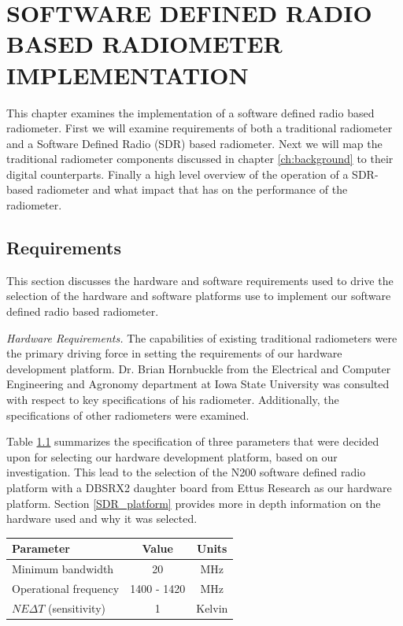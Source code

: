 \chapter{SOFTWARE DEFINED RADIO BASED RADIOMETER IMPLEMENTATION}\label{ch:implementation}

This chapter examines the implementation of a software defined radio based radiometer.  First we will examine requirements of both a traditional radiometer and a Software Defined Radio (SDR) based radiometer.  Next we will map the traditional radiometer components discussed in chapter \ref{ch:background} to their digital counterparts.  Finally a high level overview of the operation of a SDR-based radiometer and what impact that has on the performance of the radiometer.

\section{Requirements}\label{requirements}

This section discusses the hardware and software requirements used to drive the selection of the hardware and software platforms use to implement our software defined radio based radiometer.  

\emph{Hardware Requirements.}  The capabilities of existing traditional radiometers were the primary driving force in setting the requirements of our hardware development platform.  Dr. Brian Hornbuckle from the Electrical and Computer Engineering and Agronomy department at Iowa State University was consulted with respect to key specifications of his radiometer.  Additionally, the specifications of other radiometers were examined. 

Table \ref{rad_performance} summarizes the specification of three parameters that were decided upon for selecting our hardware development platform, based on our investigation.  This lead to the selection of the N200 software defined radio platform with a DBSRX2 daughter board from Ettus Research as our hardware platform.  Section \ref{SDR_platform} provides more in depth information on the hardware used and why it was selected.

\begin{table}[h!tb] \centering
{}
\label{rad_performance}
\begin{tabular}{lcc} \hline
\textbf{Parameter} & \textbf{Value} & \textbf{Units} \\ \hline
Minimum bandwidth & 20 & MHz \\
Operational frequency & 1400 - 1420 & MHz \\
$NE\Delta T$ (sensitivity) & 1 & Kelvin \\ \hline
\end{tabular}
\end{table}

